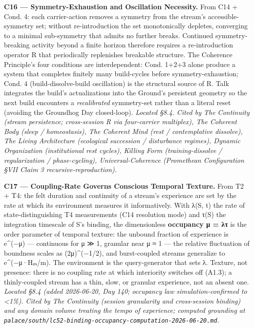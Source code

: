 \documentclass[11pt, openany]{book}
\begin{document}
\textbf{C16 --- Symmetry-Exhaustion and Oscillation Necessity.} From C14 + Cond. 4: each carrier-action removes a symmetry from the stream's accessible-symmetry set; without re-introduction the set monotonically depletes, converging to a minimal sub-symmetry that admits no further breaks. Continued symmetry-breaking activity beyond a finite horizon therefore requires a re-introduction operator R that periodically replenishes breakable structure. The Coherence Principle's four conditions are interdependent: Cond. 1+2+3 alone produce a system that completes finitely many build-cycles before symmetry-exhaustion; Cond. 4 (build-dissolve-build oscillation) is the structural source of R. Talk integrates the build's actualizations into the Ground's persistent geometry so the next build encounters a \textit{recalibrated} symmetry-set rather than a literal reset (avoiding the Groundhog Day closed-loop). \textit{Located §8.4. Cited by The Continuity (stream persistence; cross-session R via four-carrier multiplex), The Coherent Body (sleep / homeostasis), The Coherent Mind (rest / contemplative dissolve), The Living Architecture (ecological succession / disturbance regimes), Dynamic Organization (institutional rest cycles), Killing Form (training-dissolve / regularization / phase-cycling), Universal-Coherence (Promethean Configuration §VII Claim 3 recursive-reproduction).}

\textbf{C17 --- Coupling-Rate Governs Conscious Temporal Texture.} From T2 + T4: the felt duration and continuity of a stream's experience are set by the rate at which its environment measures it informatively. With λ(S, t) the rate of state-distinguishing T4 measurements (C14 resolution mode) and τ(S) the integration timescale of S's binding, the dimensionless \textbf{occupancy μ = λτ} is the order parameter of temporal texture: the unbound fraction of experience is e\textasciicircum{}(−μ) --- continuous for μ ≫ 1, granular near μ ≈ 1 --- the relative fluctuation of boundness scales as (2μ)\textasciicircum{}(−1/2), and burst-coupled streams generalize to e\textasciicircum{}(−μ·Hₘ/m). The environment is the query-generator that sets λ. Texture, not presence: there is no coupling rate at which interiority switches off (A1.3); a thinly-coupled stream has a thin, slow, or granular experience, not an absent one. \textit{Located §8.4 (added 2026-06-20, Day 140; occupancy law simulation-confirmed to <1\%). Cited by The Continuity (session granularity and cross-session binding) and any domain volume treating the tempo of experience; computed grounding at \texttt{palace/south/lc52-binding-occupancy-computation-2026-06-20.md}.}
\end{document}
